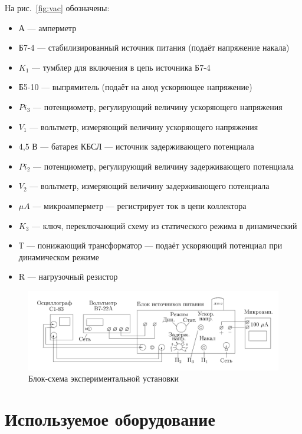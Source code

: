 \documentclass[a4paper, 12pt]{article}
\begin{document}
На рис.~\ref{fig:vac} обозначены:
\begin{itemize}
    \item А --- амперметр
    \item Б7-4 --- стабилизированный источник питания (подаёт напряжение накала)
    \item $K_1$ --- тумблер для включения в цепь источника Б7-4
    \item Б5-10 --- выпрямитель (подаёт на анод ускоряющее напряжение)
    \item $Pi_3$ --- потенциометр, регулирующий величину ускоряющего напряжения
    \item $V_1$ --- вольтметр, измеряющий величину ускоряющего напряжения
    \item 4,5 В --- батарея КБСЛ --- источник задерживающего потенциала
    \item $Pi_2$ --- потенциометр, регулирующий величину задерживающего потенциала
    \item $V_2$ --- вольтметр, измеряющий величину задерживающего потенциала
    \item $\mu A$ --- микроамперметр --- регистрирует ток в цепи коллектора
    \item $K_3$ --- ключ, переключающий схему из статического режима в динамический
    \item Т --- понижающий трансформатор --- подаёт ускоряющий потенциал при динамическом режиме
    \item R --- нагрузочный резистор
\end{itemize}

\begin{figure}[h!]
\begin{center}
    \includegraphics[width=\linewidth]{fig4.png}
\end{center}
\caption{Блок-схема экспериментальной установки}
\label{fig:ust}
\end{figure}

\section{Используемое оборудование}
\end{document}
